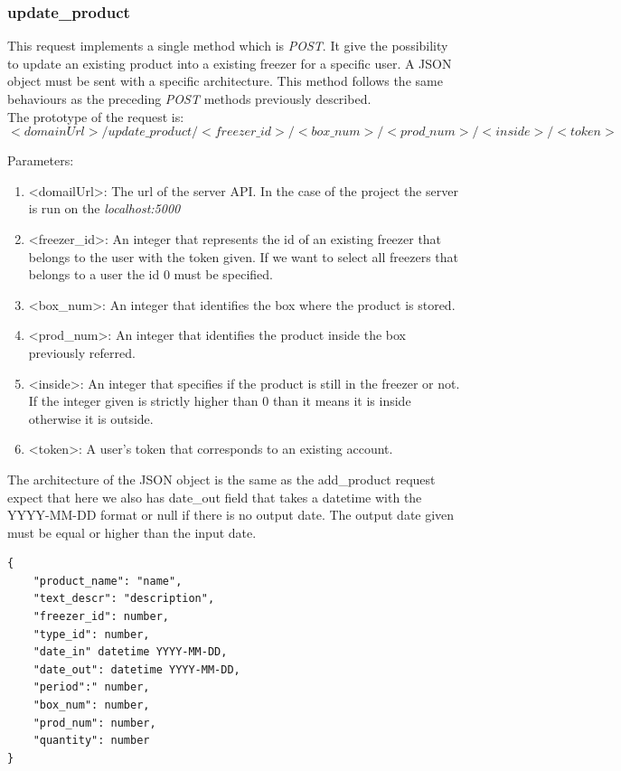 \subsubsection{update\_product}
This request implements a single method which is \textit{POST}. It give the possibility to update an existing product into a existing freezer for a specific user. A JSON object must be sent with a specific architecture. This method follows the same behaviours as the preceding \textit{POST} methods previously described.\\

The prototype of the request is:
$$<domainUrl>/update\_product/<freezer\_id>/<box\_num>/<prod\_num>/<inside>/<token>$$

Parameters:
\begin{enumerate}
\item <domailUrl>: The url of the server API. In the case of the project the server is run on the \textit{localhost:5000}
\item <freezer\_id>: An integer that represents the id of an existing freezer that belongs to the user with the token given. If we want to select all freezers that belongs to a user the id 0 must be specified.
\item <box\_num>: An integer that identifies the box where the product is stored.
\item <prod\_num>: An integer that identifies the product inside the box previously referred.
\item <inside>: An integer that specifies if the product is still in the freezer or not. If the integer given is strictly higher than 0 than it means it is inside otherwise it is outside.
\item <token>: A user's token that corresponds to an existing account.
\end{enumerate}

The architecture of the JSON object is the same as the add\_product request expect that here we also has date\_out field that takes a datetime with the YYYY-MM-DD format or null if there is no output date. The output date given must be equal or higher than the input date.
\begin{lstlisting}
{
    "product_name": "name",
    "text_descr": "description",
    "freezer_id": number,
    "type_id": number,
    "date_in" datetime YYYY-MM-DD,
    "date_out": datetime YYYY-MM-DD,
    "period":" number,
    "box_num": number,
    "prod_num": number,
    "quantity": number
}
\end{lstlisting}

